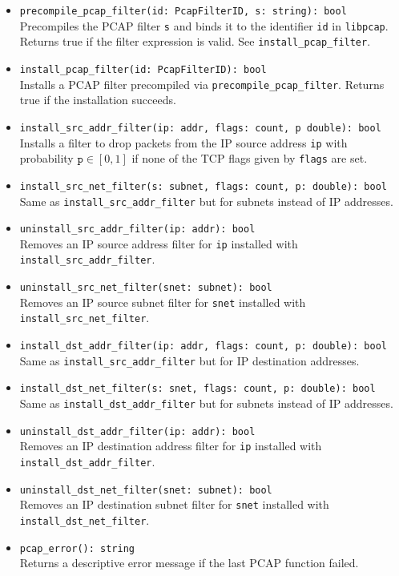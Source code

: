 \documentclass[10pt,landscape]{article}
\begin{document}
\begin{multicols*}{2}
{\begin{itemize}
  \item \verb|precompile_pcap_filter(id: PcapFilterID, s: string): bool|\\
    Precompiles the PCAP filter \verb|s| and binds it to the identifier
    \verb|id| in \texttt{libpcap}. Returns true if the filter expression is
    valid. See \verb|install_pcap_filter|.
  \item \verb|install_pcap_filter(id: PcapFilterID): bool|\\
    Installs a PCAP filter precompiled via \verb|precompile_pcap_filter|.
    Returns true if the installation succeeds.
  \item \verb|install_src_addr_filter(ip: addr, flags: count, p double): bool|\\
    Installs a filter to drop packets from the IP source address \verb|ip| with
    probability $\mathtt{p} \in [0,1]$ if none of the TCP flags given by
    \verb|flags| are set.
  \item \verb|install_src_net_filter(s: subnet, flags: count, p: double): bool|\\
    Same as \verb|install_src_addr_filter| but for subnets instead of IP
    addresses.
  \item \verb|uninstall_src_addr_filter(ip: addr): bool|\\
    Removes an IP source address filter for \verb|ip| installed with
    \verb|install_src_addr_filter|.
  \item \verb|uninstall_src_net_filter(snet: subnet): bool|\\
    Removes an IP source subnet filter for \verb|snet| installed with
    \verb|install_src_net_filter|.
  \item \verb|install_dst_addr_filter(ip: addr, flags: count, p: double): bool|\\
    Same as \verb|install_src_addr_filter| but for IP destination addresses.
  \item \verb|install_dst_net_filter(s: snet, flags: count, p: double): bool|\\
    Same as \verb|install_dst_addr_filter| but for subnets instead of IP
    addresses.
  \item \verb|uninstall_dst_addr_filter(ip: addr): bool|\\
    Removes an IP destination address filter for \verb|ip| installed with
    \verb|install_dst_addr_filter|.
  \item \verb|uninstall_dst_net_filter(snet: subnet): bool|\\
    Removes an IP destination subnet filter for \verb|snet| installed with
    \verb|install_dst_net_filter|.
  \item \verb|pcap_error(): string|\\
    Returns a descriptive error message if the last PCAP function failed.
\end{itemize}
}


\end{multicols*}
\end{document}
